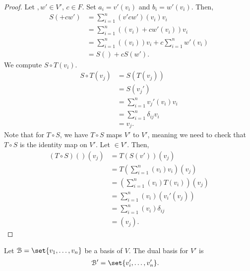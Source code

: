 \documentclass[10pt]{mypackage}
\begin{document}
\begin{proof}
  Let $,w'\in V'$, $c\in F$. Set $a_i = v'\left(v_i\right)$ and $b_i = w'\left(v_i\right)$. Then,
  \begin{align*}
    S\left( + cw'\right) &= \sum_{i=1}^{n}\left(v' cw'\right)\left(v_i\right)v_i\\
                           &= \sum_{i=1}^{n}\left(\left(v_i\right) + cw'\left(v_i\right)\right)v_i\\
                           &= \sum_{i=1}^{n}\left(\left(v_i\right)\right)v_i + c\sum_{i=1}^{n}w'\left(v_i\right)\\
                           &= S\left(\right) + cS\left(w'\right).
  \end{align*}
  We compute $S\circ T\left(v_i\right)$.
  \begin{align*}
    S\circ T\left(v_j\right) &= S\left(T\left(v_j\right)\right)\\
                             &= S\left(v_j'\right)\\
                             &= \sum_{i=1}^{n}v_j'\left(v_i\right)v_i\\
                             &= \sum_{i=1}^{n}\delta_{ij}v_i\\
                             &= v_j.
  \end{align*}
  Note that for $T\circ S$, we have $T\circ S$ maps $V'$ to $V'$, meaning we need to check that $T\circ S$ is the identity map on $V'$. Let $\in V'$. Then,
  \begin{align*}
    \left(T\circ S\right)\left(\right)\left(v_j\right) &= T\left(S\left(v'\right)\right)\left(v_j\right)\\
                                                         &= T\left(\sum_{i=1}^{n}\left(v_i\right)v_i\right)\left(v_j\right)\\
                                                         &= \left(\sum_{i=1}^{n}\left(v_i\right)T\left(v_i\right)\right)\left(v_j\right)\\
                                                         &= \sum_{i=1}^{n}\left(v_i\right)\left(v_i'\left(v_j\right)\right)\\
                                                         &= \sum_{i=1}^{n}\left(v_i\right)\delta_{ij}\\
                                                         &= \left(v_j\right).
  \end{align*}
\end{proof}
\begin{definition}
  Let $\mathcal{B} = \set{v_1,\dots,v_n}$ be a basis of $V$. The dual basis for $V'$ is
  \begin{align*}
    \mathcal{B}' &= \set{v_i',\dots,v_n'}.
  \end{align*}
\end{definition}
\end{document}
